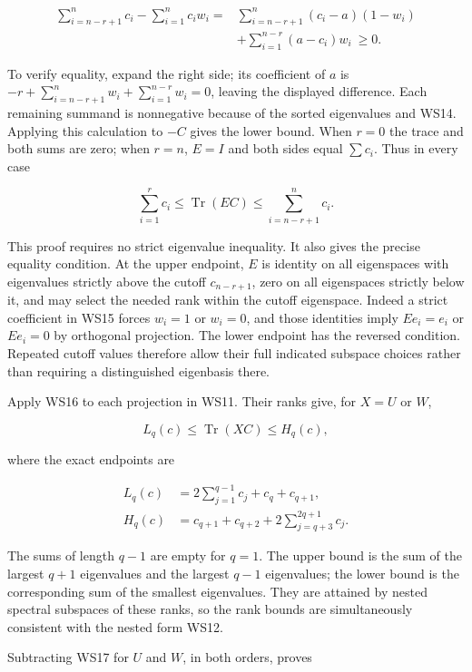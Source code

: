 \[
\begin{aligned}
\sum_{i=n-r+1}^n c_i-\sum_{i=1}^n c_iw_i
={}&\sum_{i=n-r+1}^n(c_i-a)(1-w_i)\\
&+\sum_{i=1}^{n-r}(a-c_i)w_i\ \ge0.
\end{aligned}
\tag{WS15}
\]

To verify equality, expand the right side; its coefficient of \(a\) is \(-r+\sum_{i=n-r+1}^nw_i+\sum_{i=1}^{n-r}w_i=0\), leaving the displayed difference. Each remaining summand is nonnegative because of the sorted eigenvalues and WS14. Applying this calculation to \(-C\) gives the lower bound. When \(r=0\) the trace and both sums are zero; when \(r=n\), \(E=I\) and both sides equal \(\sum c_i\). Thus in every case

\[
\sum_{i=1}^r c_i\le\operatorname{Tr}(EC)
\le\sum_{i=n-r+1}^{n}c_i.
\tag{WS16}
\]

This proof requires no strict eigenvalue inequality. It also gives the precise equality condition. At the upper endpoint, \(E\) is identity on all eigenspaces with eigenvalues strictly above the cutoff \(c_{n-r+1}\), zero on all eigenspaces strictly below it, and may select the needed rank within the cutoff eigenspace. Indeed a strict coefficient in WS15 forces \(w_i=1\) or \(w_i=0\), and those identities imply \(Ee_i=e_i\) or \(Ee_i=0\) by orthogonal projection. The lower endpoint has the reversed condition. Repeated cutoff values therefore allow their full indicated subspace choices rather than requiring a distinguished eigenbasis there.

Apply WS16 to each projection in WS11. Their ranks give, for \(X=U\) or \(W\),

\[
L_q(c)\le\operatorname{Tr}(XC)\le H_q(c),
\tag{WS17}
\]

where the exact endpoints are

\[
\begin{aligned}
L_q(c)&=2\sum_{j=1}^{q-1}c_j+c_q+c_{q+1},\\
H_q(c)&=c_{q+1}+c_{q+2}
       +2\sum_{j=q+3}^{2q+1}c_j.
\end{aligned}
\tag{WS18}
\]

The sums of length \(q-1\) are empty for \(q=1\). The upper bound is the sum of the largest \(q+1\) eigenvalues and the largest \(q-1\) eigenvalues; the lower bound is the corresponding sum of the smallest eigenvalues. They are attained by nested spectral subspaces of these ranks, so the rank bounds are simultaneously consistent with the nested form WS12.

Subtracting WS17 for \(U\) and \(W\), in both orders, proves

